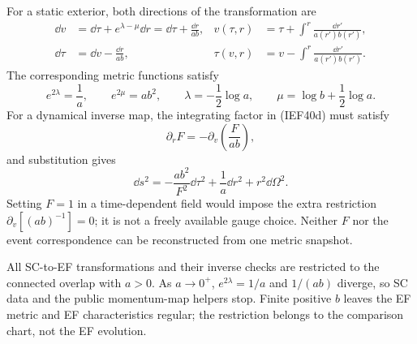 For a static exterior, both directions of the transformation are
\begin{align}
 \dd v&=\dd\tau+e^{\lambda-\mu}\dd r
       =\dd\tau+\frac{\dd r}{ab},
 &v(\tau,r)&=\tau+\int^r\frac{\dd r'}{a(r')b(r')},       \tag{IEF40a}\\
 \dd\tau&=\dd v-\frac{\dd r}{ab},
 &\tau(v,r)&=v-\int^r\frac{\dd r'}{a(r')b(r')}.          \tag{IEF40b}
\end{align}
The corresponding metric functions satisfy
\[
 e^{2\lambda}=\frac1a,\qquad e^{2\mu}=ab^2,\qquad
 \lambda=-\frac12\log a,\qquad
 \mu=\log b+\frac12\log a.                               \tag{IEF40c}
\]
For a dynamical inverse map, the integrating factor in (IEF40d) must satisfy
\[
 \partial_r F=-\partial_v\left(\frac{F}{ab}\right),       \tag{IEF40e}
\]
and substitution gives
\[
 \dd s^2=-\frac{ab^2}{F^2}\dd\tau^2
          +\frac1a\dd r^2+r^2\dd\Omega^2.                \tag{IEF40f}
\]
Setting \(F=1\) in a time-dependent field would impose the extra restriction
\(\partial_v[(ab)^{-1}]=0\); it is not a freely available gauge choice.
Neither \(F\) nor the event correspondence can be reconstructed from one
metric snapshot.

All SC-to-EF transformations and their inverse checks are restricted to the
connected overlap with \(a>0\).  As \(a\to0^+\), \(e^{2\lambda}=1/a\) and
\(1/(ab)\) diverge, so SC data and the public momentum-map helpers stop.
Finite positive \(b\) leaves the EF metric and EF characteristics regular;
the restriction belongs to the comparison chart, not the EF evolution.

